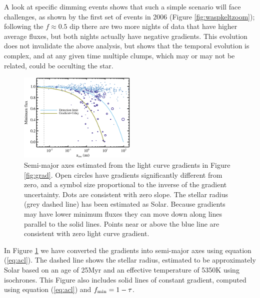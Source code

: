 \documentclass[]{rsos}
\begin{document}
A look at specific dimming events shows that such a simple scenario will face challenges,
as shown by the first set of events in 2006 (Figure \ref{fig:waspkeltzoom}); following
the $f \approx 0.5$ dip there are two more nights of data that have higher average
fluxes, but both nights actually have negative gradients. This evolution does not
invalidate the above analysis, but shows that the temporal evolution is complex, and at
any given time multiple clumps, which may or may not be related, could be occulting the
star.

\begin{figure}
  \begin{center}
    \hspace{-0.5cm} \includegraphics[width=0.5\textwidth]{figs/sma.eps}
    \caption{Semi-major axes estimated from the light curve gradients in Figure
      \ref{fig:grad}. Open circles have gradients significantly different from zero, and
      a symbol size proportional to the inverse of the gradient uncertainty. Dots are
      consistent with zero slope. The stellar radius (grey dashed line) has been
      estimated as Solar. Because gradients may have lower minimum fluxes they can move
      down along lines parallel to the solid lines. Points near or above the blue line
      are consistent with zero light curve gradient.}\label{fig:sma}
  \end{center}
\end{figure}

In Figure \ref{fig:sma} we have converted the gradients into semi-major axes using
equation (\ref{eq:acl}). The dashed line shows the stellar radius, estimated to be
approximately Solar based on an age of 25Myr \cite{2013AstL...39..776P} and an effective
temperature of 5350K \cite{2014A&A...563A.139P} using \cite{2000A&A...358..593S}
isochrones. This Figure also includes solid lines of constant gradient, computed using
equation (\ref{eq:acl}) and $f_{\rm min} = 1-\tau$.
\end{document}
